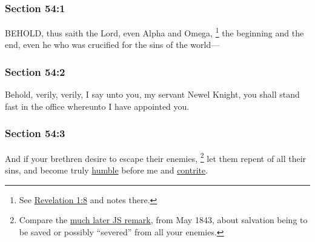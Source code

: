 	\subsubsection{Section 54:1} %
		\label{DC54-1}

		BEHOLD, thus saith the Lord, even Alpha and Omega,%
			\footnote{%
				See \hyperref[REVELATIONNT-1-8]{Revelation 1:8} and notes there.
				}
		the beginning and the end, even he who was crucified for the sins of the world---


	\subsubsection{Section 54:2} %
		\label{DC54-2}

		Behold, verily, verily, I say unto you, my servant Newel Knight, you shall stand fast in the office whereunto I have appointed you.


	\subsubsection{Section 54:3} %
		\label{DC54-3}

		And if your brethren desire to escape their enemies,%
			\footnote{%
				Compare the \hyperref[SALVATION-JS]{much later JS remark}, from May 1843, about salvation being to be saved or possibly ``severed'' from all your enemies.
				}
		let them repent of all their sins, and become truly \hyperref[HUMILITY]{humble} before me and \hyperref[CONTRITE]{contrite}.

